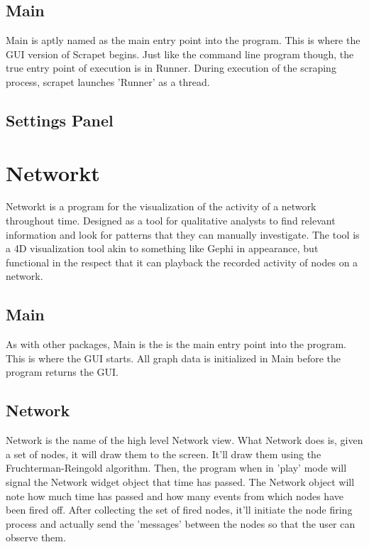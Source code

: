 \subsection{Main}
Main is aptly named as the main entry point into the program. This is where the GUI version of Scrapet begins. Just like the command line program though, the true entry point of execution is in Runner. During execution of the scraping process, scrapet launches 'Runner' as a thread.

\subsection{Settings Panel}

\section{Networkt}
Networkt is a program for the visualization of the activity of a network throughout time. Designed as a tool for qualitative analysts to find relevant information and look for patterns that they can manually investigate. The tool is a 4D visualization tool akin to something like Gephi in appearance, but functional in the respect that it can playback the recorded activity of nodes on a network.

\subsection{Main}
As with other packages, Main is the is the main entry point into the program. This is where the GUI starts. All graph data is initialized in Main before the program returns the GUI.

\subsection{Network}
Network is the name of the high level Network view. What Network does is, given a set of nodes, it will draw them to the screen. It'll draw them using the Fruchterman-Reingold algorithm. Then, the program when in 'play' mode will signal the Network widget object that time has passed. The Network object will note how much time has passed and how many events from which nodes have been fired off. After collecting the set of fired nodes, it'll initiate the node firing process and actually send the 'messages' between the nodes so that the user can observe them.

